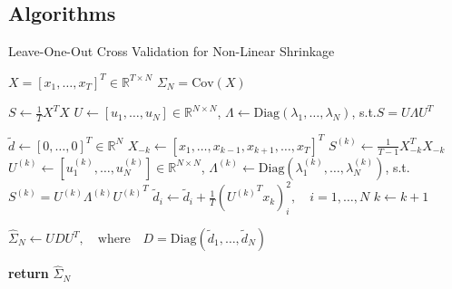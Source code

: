 \documentclass{article}
\begin{document}
\subsection{Algorithms}


\begin{algorithm}
	\caption{Leave-One-Out Cross Validation for Non-Linear Shrinkage}
	\label{alg:nls_loo}
	\begin{algorithmic}[1]
	\Require $X = [x_1, \ldots, x_T]^T \in \mathbb{R}^{T\times N}$
	\Require $\Sigma_N = \mathrm{Cov}(X)$

		\State $S \gets \frac1T X^T X$
		\State 
				$U \gets [u_1, \ldots, u_N] \in \mathbb{R}^{N\times N}$,
				\quad $\Lambda \gets \mathrm{Diag}(\lambda_1, \ldots, \lambda_N)$,
				\quad \mbox{s.t.}\quad $S = U \Lambda {U}^T$

		\State $\tilde{d} \gets [0, \ldots, 0]^T \in \mathbb{R}^{N}$
			\State $X_{-k} \gets [x_1, \ldots, x_{k-1}, x_{k+1}, \ldots, x_T]^T$
			\State $S^{(k)} \gets \frac{1}{T-1} X_{-k}^T X_{-k} $
			\State 
				$U^{(k)} \gets [u^{(k)}_1, \ldots, u^{(k)}_N] \in \mathbb{R}^{N\times N}$,
				\quad $\Lambda^{(k)} 
					\gets \mathrm{Diag}(\lambda^{(k)}_1, \ldots, \lambda^{(k)}_N)$,
				\quad \mbox{s.t.}\quad $S^{(k)} = U^{(k)} \Lambda^{(k)} {U^{(k)}}^T$
			\State $\tilde{d}_i \gets \tilde{d}_i 
				+ \frac1T ({U^{(k)}}^T x_k)_i^2, \quad i = 1, \ldots, N$
			\State $k \gets k+1$
		\EndWhile

		\State $\hat{\Sigma}_N \gets UDU^T, \quad 
			\mbox{where}\quad D = \mathrm{Diag}(\tilde{d}_1, \ldots, \tilde{d}_N)$

		\State \textbf{return} $\hat{\Sigma}_N$ 
	\EndProcedure
	\end{algorithmic}
\end{algorithm}
\end{document}
